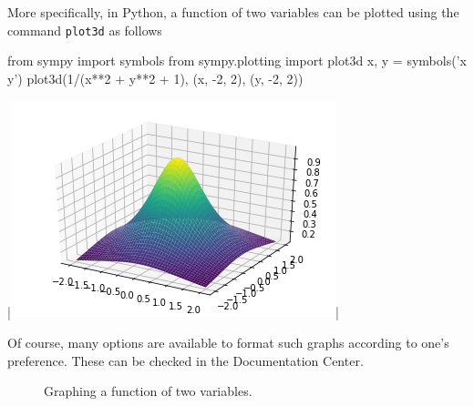 \ifpython
\ifpython
 More specifically, in Python, a function of two variables can be plotted using the command \lstinline{plot3d} as follows \begin{pyin}
from sympy import symbols
from sympy.plotting import plot3d
x, y = symbols('x y')
plot3d(1/(x**2 + y**2 + 1), (x, -2, 2), (y, -2, 2))
\end{pyin}
\begin{pyout}
|\includegraphics{fig_multi_var_2_Python}|
\end{pyout}
\fi
\fi
Of course, many options are available to format such graphs according to one's preference. These can be checked in the Documentation Center. 

\begin{figure}
\centering
\qquad
{}
\caption{Graphing a function of two variables. }
\end{figure}


